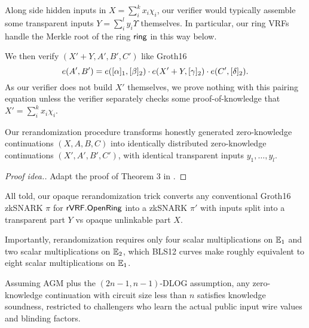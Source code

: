 Along side hidden inputs in $X = \sum_i^k x_i \chi_i$,
our verifier would typically assemble some transparent inputs
$Y = \sum_i^l y_i \Upsilon$ themselves.  In particular, our ring VRFs
handle the Merkle root \comring of the ring $\mathsf{ring}$ in this way below.

We then verify $(X' + Y,A',B',C')$ like Groth16 
$$ e(A',B') = e([\alpha]_1, [\beta]_2) \cdot
 e(X' + Y, [\gamma]_2) \cdot e(C', [\delta]_2) . $$
As our verifier does not build $X'$ themselves, we prove nothing
with this pairing equation unless the verifier separately checks
 some proof-of-knowledge that $X' = \sum_i^k x_i \chi_i$.

\begin{lemma}\label{lem:unlinkable}
Our rerandomization procedure %
transforms honestly generated zero-knowledge continuations $(X,A,B,C)$
into identically distributed zero-knowledge continuations $(X',A',B',C')$,
with identical transparent inputs $y_1,\ldots,y_l$.
\end{lemma}

\begin{proof}[Proof idea.]
Adapt the proof of Theorem 3 in \cite[Appendix C, pp. 31]{RandomizationGroth16}.
\end{proof}


All told, our opaque rerandomization trick converts any conventional
Groth16 zkSNARK $\pi$ for ${\mathsf{rVRF}}.{\mathsf{OpenRing}}$ into a zkSNARK $\pi'$
with inputs split into a transparent part $Y$ vs opaque unlinkable part $X$.

Importantly, rerandomization requires only
 four scalar multiplications on ${\mathbb{E}}_1$ and
 two scalar multiplications on ${\mathbb{E}}_2$,
which  BLS12 curves make roughly equivalent to
 eight scalar multiplications on ${\mathbb{E}}_1$.


\begin{lemma}\label{lem:knowledge_soundness}
Assuming AGM plus the $(2n-1,n-1)$-DLOG assumption,
any zero-knowledge continuation with circuit size less than $n$
satisfies knowledge soundness, restricted to challengers
 who learn the actual public input wire values and blinding factors.
\end{lemma}

